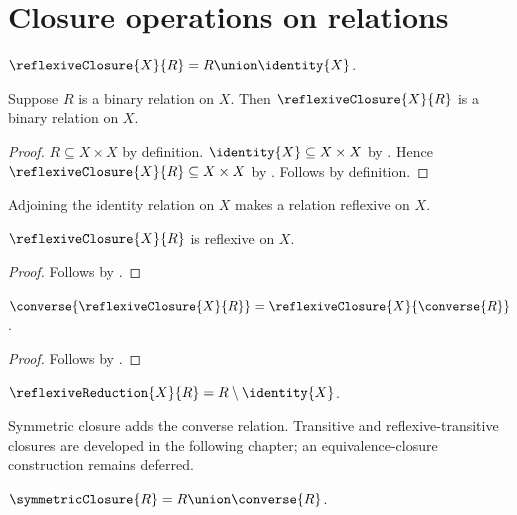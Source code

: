 


\section{Closure operations on relations}

\begin{definition}\label{reflexive_closure}
    $\reflexiveClosure{X}{R} = R\union\identity{X}$.
\end{definition}

\begin{classification}\label{reflexive_closure_binary_relation_on}
    Suppose $R$ is a binary relation on $X$.
    Then $\reflexiveClosure{X}{R}$ is a binary relation on $X$.
\end{classification}
\begin{proof}
    $R\subseteq X\times X$ by definition.
    $\identity{X}\subseteq X\times X$
        by .
    Hence $\reflexiveClosure{X}{R}\subseteq X\times X$ by
        .
    Follows by definition.
\end{proof}

Adjoining the identity relation on $X$ makes a relation reflexive on $X$.

\begin{proposition}\label{reflexive_closure_is_reflexive}
    $\reflexiveClosure{X}{R}$ is reflexive on $X$.
\end{proposition}
\begin{proof}
    Follows by .
\end{proof}

\begin{proposition}\label{converse_reflexive_closure}
    $\converse{\reflexiveClosure{X}{R}}
        =\reflexiveClosure{X}{\converse{R}}$.
\end{proposition}
\begin{proof}
    Follows by
        .
\end{proof}

\begin{definition}\label{reflexive_reduction}
    $\reflexiveReduction{X}{R} = R\setminus\identity{X}$.
\end{definition}

Symmetric closure adds the converse relation. Transitive and
reflexive-transitive closures are developed in the following chapter; an
equivalence-closure construction remains deferred.

\begin{definition}\label{symmetric_closure}
    $\symmetricClosure{R} = R\union\converse{R}$.
\end{definition}

